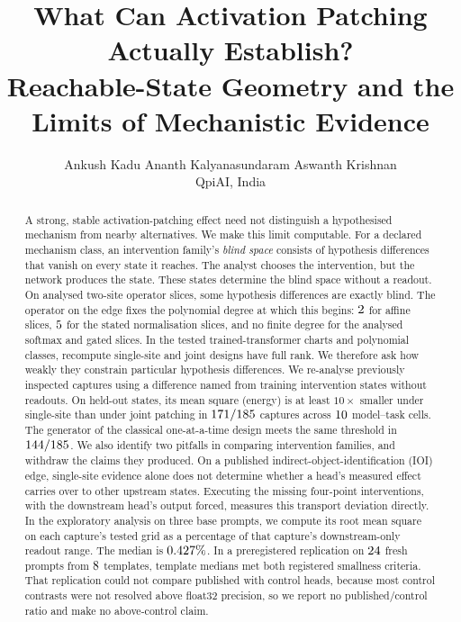 \documentclass{article}
\title{What Can Activation Patching Actually Establish?\\
       Reachable-State Geometry and the Limits of Mechanistic Evidence}
\author{Ankush Kadu \qquad Ananth Kalyanasundaram \qquad Aswanth Krishnan\\
  QpiAI, India}
\theoremstyle{plain}
\theoremstyle{definition}
\begin{document}
\maketitle


\begin{abstract}
A strong, stable activation-patching effect need not distinguish a hypothesised mechanism from nearby alternatives.
We make this limit computable. For a declared mechanism class, an intervention family's \emph{blind space} consists
of hypothesis differences that vanish on every state it reaches. The analyst chooses the intervention, but the
network produces the state. These states determine the blind space without a readout. On analysed two-site operator slices, some hypothesis differences are exactly blind. The
operator on the edge fixes the polynomial degree at which this begins: $2$ for affine slices,
$5$ for the stated normalisation slices, and no finite degree for the analysed softmax and gated slices. In the tested trained-transformer charts and polynomial classes, recompute single-site and joint designs have full
rank. We therefore ask how weakly they constrain particular hypothesis differences. We re-analyse previously inspected
captures using a difference named from training intervention states without readouts. On held-out states, its mean square
(energy) is at least $10\times$ smaller under single-site than under joint patching in $171/185$ captures across $10$
model--task cells. The generator of the classical one-at-a-time design meets the same threshold in $144/185$. We also identify two
pitfalls in comparing intervention families, and withdraw the claims they produced. On a published
indirect-object-identification (IOI) edge, single-site evidence alone does not determine whether a head's measured
effect carries over to other upstream states. Executing the missing four-point interventions, with the downstream
head's output forced, measures this transport deviation directly. In the exploratory analysis on three base prompts, we compute its root mean square on each capture's tested grid
as a percentage of that capture's downstream-only readout range. The median is $0.427\%$. In a preregistered replication on
$24$ fresh prompts from $8$ templates, template medians met both registered smallness criteria. That
replication could not compare published with control heads, because most control contrasts were not resolved above
float32 precision, so we report no published/control ratio and make no above-control claim.
\end{abstract}
\end{document}
